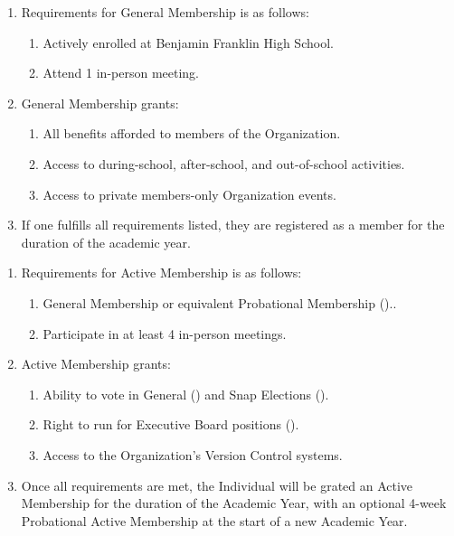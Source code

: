 
\begin{enumerate}
	\item Requirements for General Membership is as follows:
		\begin{enumerate}
			\item Actively enrolled at Benjamin Franklin High School.

			\item Attend 1 in-person meeting.
		\end{enumerate}

	\item General Membership grants:
		\begin{enumerate}
			\item All benefits afforded to members of the Organization.

			\item Access to during-school, after-school, and out-of-school activities.

			\item Access to private members-only Organization events.
		\end{enumerate}

	\item If one fulfills all requirements listed, they are registered as a member
		for the duration of the academic year.
\end{enumerate}

\begin{enumerate}
	\item Requirements for Active Membership is as follows:
		\begin{enumerate}
			\item General Membership or equivalent Probational Membership ()..

			\item Participate in at least 4 in-person meetings.
		\end{enumerate}

	\item Active Membership grants:
		\begin{enumerate}
			\item Ability to vote in General () and Snap
				Elections ().

			\item Right to run for Executive Board positions ().
			
			\item Access to the Organization's Version Control systems.
		\end{enumerate}

	\item Once all requirements are met, the Individual will be grated an Active
		Membership for the duration of the Academic Year, with an optional 4-week Probational
		Active Membership at the start of a new Academic Year.
\end{enumerate}

